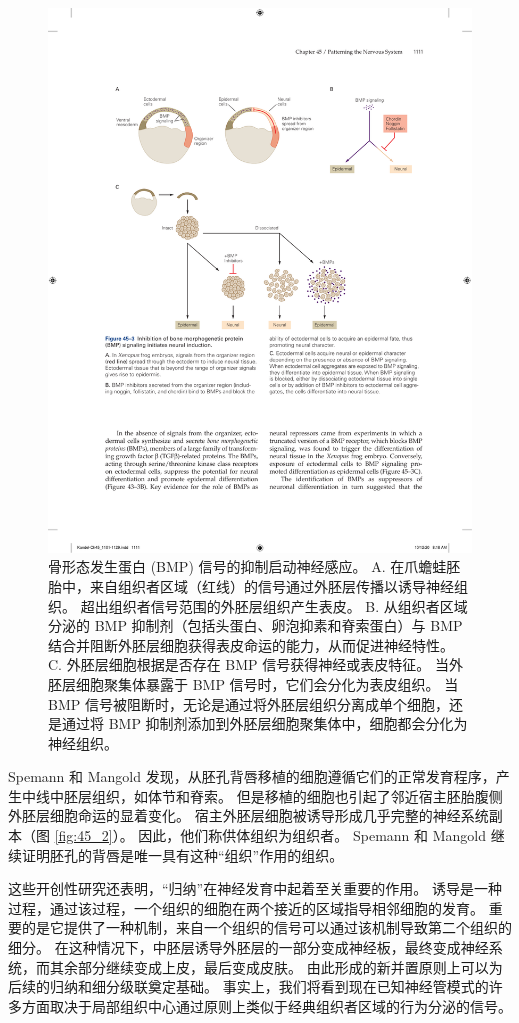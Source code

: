 \begin{figure}[htbp]
	\centering
	\includegraphics[width=0.9\linewidth]{chap45/fig_45_3}
	\caption{骨形态发生蛋白 (BMP) 信号的抑制启动神经感应。 A. 在爪蟾蛙胚胎中，来自组织者区域（红线）的信号通过外胚层传播以诱导神经组织。 超出组织者信号范围的外胚层组织产生表皮。 B. 从组织者区域分泌的 BMP 抑制剂（包括头蛋白、卵泡抑素和脊索蛋白）与 BMP 结合并阻断外胚层细胞获得表皮命运的能力，从而促进神经特性。 C. 外胚层细胞根据是否存在 BMP 信号获得神经或表皮特征。 当外胚层细胞聚集体暴露于 BMP 信号时，它们会分化为表皮组织。 当 BMP 信号被阻断时，无论是通过将外胚层组织分离成单个细胞，还是通过将 BMP 抑制剂添加到外胚层细胞聚集体中，细胞都会分化为神经组织。}
	\label{fig:45_3}
\end{figure}

Spemann 和 Mangold 发现，从胚孔背唇移植的细胞遵循它们的正常发育程序，产生中线中胚层组织，如体节和脊索。 但是移植的细胞也引起了邻近宿主胚胎腹侧外胚层细胞命运的显着变化。 宿主外胚层细胞被诱导形成几乎完整的神经系统副本（图 \ref{fig:45_2}）。 因此，他们称供体组织为组织者。 Spemann 和 Mangold 继续证明胚孔的背唇是唯一具有这种“组织”作用的组织。

这些开创性研究还表明，“归纳”在神经发育中起着至关重要的作用。 诱导是一种过程，通过该过程，一个组织的细胞在两个接近的区域指导相邻细胞的发育。 重要的是它提供了一种机制，来自一个组织的信号可以通过该机制导致第二个组织的细分。 在这种情况下，中胚层诱导外胚层的一部分变成神经板，最终变成神经系统，而其余部分继续变成上皮，最后变成皮肤。 由此形成的新并置原则上可以为后续的归纳和细分级联奠定基础。 事实上，我们将看到现在已知神经管模式的许多方面取决于局部组织中心通过原则上类似于经典组织者区域的行为分泌的信号。

